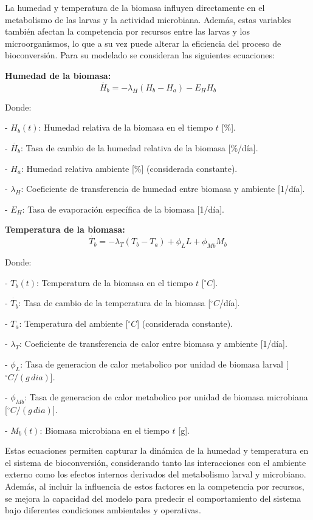 La humedad y temperatura de la biomasa influyen directamente en el metabolismo de las larvas y la actividad microbiana. Además, estas variables también afectan la competencia por recursos entre las larvas y los microorganismos, lo que a su vez puede alterar la eficiencia del proceso de bioconversión. Para su modelado se consideran las siguientes ecuaciones:

\vspace{1cm}
\textbf{Humedad de la biomasa:}
\begin{equation}
\dot{H_b} = -\lambda_H (H_b - H_a) - E_H H_b
\end{equation}

Donde:

- $H_b(t)$: Humedad relativa de la biomasa en el tiempo $t$ [\%].

- $\dot{H_b}$: Tasa de cambio de la humedad relativa de la biomasa [\%/día].

- $H_a$: Humedad relativa ambiente [\%] (considerada constante).

- $\lambda_H$: Coeficiente de transferencia de humedad entre biomasa y ambiente [1/día].

- $E_H$: Tasa de evaporación específica de la biomasa [1/día].

\vspace{1cm}
\textbf{Temperatura de la biomasa:}
\begin{equation}
\dot{T_b} = -\lambda_T (T_b - T_a) + \phi_L L + \phi_{Mb} M_b
\end{equation}

Donde:

- $T_b(t)$: Temperatura de la biomasa en el tiempo $t$ [$^{\circ}C$].

- $\dot{T_b}$: Tasa de cambio de la temperatura de la biomasa [$^{\circ}C$/día].

- $T_a$: Temperatura del ambiente [$^{\circ}C$] (considerada constante).

- $\lambda_T$: Coeficiente de transferencia de calor entre biomasa y ambiente [1/día].

- $\phi_L$: Tasa de generacion de calor metabolico por unidad de biomasa larval [$^{\circ}C/(g \, dia)$].

- $\phi_{Mb}$: Tasa de generacion de calor metabolico por unidad de biomasa microbiana [$^{\circ}C/(g \, dia)$].

- $M_b(t)$: Biomasa microbiana en el tiempo $t$ [g].

\vspace{1cm}
Estas ecuaciones permiten capturar la dinámica de la humedad y temperatura en el sistema de bioconversión, considerando tanto las interacciones con el ambiente externo como los efectos internos derivados del metabolismo larval y microbiano. Además, al incluir la influencia de estos factores en la competencia por recursos, se mejora la capacidad del modelo para predecir el comportamiento del sistema bajo diferentes condiciones ambientales y operativas.

